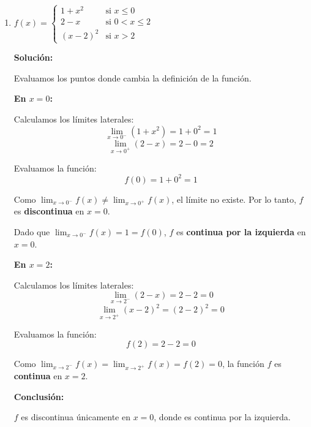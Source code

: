 \documentclass[12pt]{article}
\newcommand{\solucion}{%
    \vspace{0.8em}%
    \textbf{Solución:}%
}
\begin{document}
\begin{enumerate}[label=\alph*)]

    \item $f(x) = \begin{cases} 1 + x^2 & \text{si } x \leq 0 \\ 2 - x & \text{si } 0 < x \leq 2 \\ (x-2)^2 & \text{si } x > 2 \end{cases}$

    \solucion

    Evaluamos los puntos donde cambia la definición de la función.

    \textbf{En $x = 0$:}

    Calculamos los límites laterales:
    \[
    \lim_{x \to 0^-} (1 + x^2) = 1 + 0^2 = 1
    \]
    \[
    \lim_{x \to 0^+} (2 - x) = 2 - 0 = 2
    \]

    Evaluamos la función:
    \[
    f(0) = 1 + 0^2 = 1
    \]

    Como $\displaystyle\lim_{x \to 0^-} f(x) \neq \lim_{x \to 0^+} f(x)$, el límite no existe. Por lo tanto, $f$ es \textbf{discontinua} en $x = 0$.

    Dado que $\displaystyle\lim_{x \to 0^-} f(x) = 1 = f(0)$, $f$ es \textbf{continua por la izquierda} en $x = 0$.

    \vspace{0.5em}
    \textbf{En $x = 2$:}

    Calculamos los límites laterales:
    \[
    \lim_{x \to 2^-} (2 - x) = 2 - 2 = 0
    \]
    \[
    \lim_{x \to 2^+} (x - 2)^2 = (2 - 2)^2 = 0
    \]

    Evaluamos la función:
    \[
    f(2) = 2 - 2 = 0
    \]

    Como $\displaystyle\lim_{x \to 2^-} f(x) = \lim_{x \to 2^+} f(x) = f(2) = 0$, la función $f$ es \textbf{continua} en $x = 2$.

    \newpage
    \vspace{0.5em}
    \textbf{Conclusión:}

    $f$ es discontinua únicamente en $x = 0$, donde es continua por la izquierda.

    \begin{figure}[H]
    \centering
\end{figure}
\end{enumerate}
\end{document}
